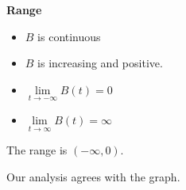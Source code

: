 \documentclass{ximera}
\begin{document}
\begin{example}
\textbf{Range}

 
\begin{itemize}
\item $B$ is continuous
\item $B$ is increasing and positive.
\item $\lim\limits_{t \to -\infty} B(t) = 0$
\item $\lim\limits_{t \to \infty} B(t) = \infty$
\end{itemize}


The range is $(-\infty, 0)$. 










Our analysis agrees with the graph. 




\end{example}
\end{document}
